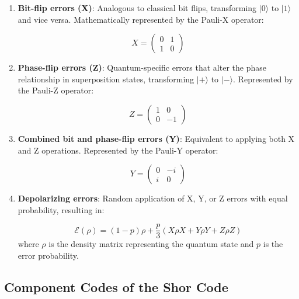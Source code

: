 \documentclass[12pt,a4paper]{article}
\begin{document}
\begin{enumerate}
    \item \textbf{Bit-flip errors (X)}: Analogous to classical bit flips, transforming $|0\rangle$ to $|1\rangle$ and vice versa. Mathematically represented by the Pauli-X operator:
    
    \begin{equation}
        X = \begin{pmatrix} 0 & 1 \\ 1 & 0 \end{pmatrix}
    \end{equation}

    \item \textbf{Phase-flip errors (Z)}: Quantum-specific errors that alter the phase relationship in superposition states, transforming $|+\rangle$ to $|-\rangle$. Represented by the Pauli-Z operator:
    
    \begin{equation}
        Z = \begin{pmatrix} 1 & 0 \\ 0 & -1 \end{pmatrix}
    \end{equation}

    \item \textbf{Combined bit and phase-flip errors (Y)}: Equivalent to applying both X and Z operations. Represented by the Pauli-Y operator:
    
    \begin{equation}
        Y = \begin{pmatrix} 0 & -i \\ i & 0 \end{pmatrix}
    \end{equation}

    \item \textbf{Depolarizing errors}: Random application of X, Y, or Z errors with equal probability, resulting in:
    
    \begin{equation}
        \mathcal{E}(\rho) = (1-p)\rho + \frac{p}{3}(X\rho X + Y\rho Y + Z\rho Z)
    \end{equation}
    where $\rho$ is the density matrix representing the quantum state and $p$ is the error probability.
\end{enumerate}

\subsection{Component Codes of the Shor Code}
\end{document}
